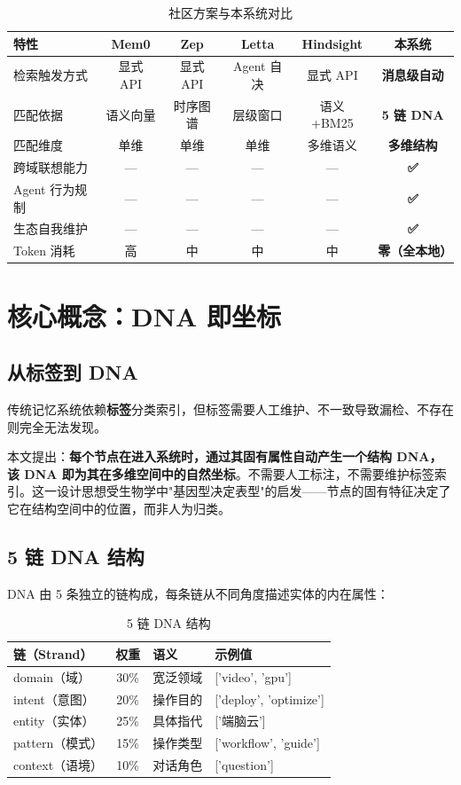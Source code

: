 \documentclass[11pt,a4paper]{article}
\begin{document}
\begin{table}[ht]
\centering
\caption{社区方案与本系统对比}
\label{tab:comparison}
\begin{tabular}{lccccc}
\toprule
特性 & Mem0 & Zep & Letta & Hindsight & \textbf{本系统} \\
\midrule
检索触发方式 & 显式 API & 显式 API & Agent 自决 & 显式 API & \textbf{消息级自动} \\
匹配依据 & 语义向量 & 时序图谱 & 层级窗口 & 语义+BM25 & \textbf{5 链 DNA} \\
匹配维度 & 单维 & 单维 & 单维 & 多维语义 & \textbf{多维结构} \\
跨域联想能力 & --- & --- & --- & --- & \textbf{✅} \\
Agent 行为规制 & --- & --- & --- & --- & \textbf{✅} \\
生态自我维护 & --- & --- & --- & --- & \textbf{✅} \\
Token 消耗 & 高 & 中 & 中 & 中 & \textbf{零（全本地）} \\
\bottomrule
\end{tabular}
\end{table}

\section{核心概念：DNA 即坐标}

\subsection{从标签到 DNA}
传统记忆系统依赖\textbf{标签}分类索引，但标签需要人工维护、不一致导致漏检、不存在则完全无法发现。

本文提出：\textbf{每个节点在进入系统时，通过其固有属性自动产生一个结构 DNA，该 DNA 即为其在多维空间中的自然坐标}。不需要人工标注，不需要维护标签索引。这一设计思想受生物学中"基因型决定表型"的启发——节点的固有特征决定了它在结构空间中的位置，而非人为归类。

\subsection{5 链 DNA 结构}
DNA 由 5 条独立的链构成，每条链从不同角度描述实体的内在属性：

\begin{table}[ht]
\centering
\caption{5 链 DNA 结构}
\label{tab:dna}
\begin{tabular}{lcll}
\toprule
链（Strand） & 权重 & 语义 & 示例值 \\
\midrule
domain（域） & 30\% & 宽泛领域 & ['video', 'gpu'] \\
intent（意图） & 20\% & 操作目的 & ['deploy', 'optimize'] \\
entity（实体） & 25\% & 具体指代 & ['端脑云'] \\
pattern（模式） & 15\% & 操作类型 & ['workflow', 'guide'] \\
context（语境） & 10\% & 对话角色 & ['question'] \\
\bottomrule
\end{tabular}
\end{table}
\end{document}
